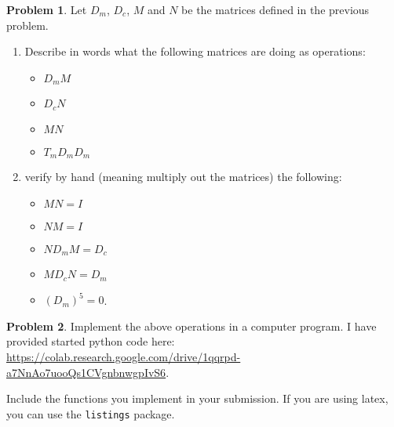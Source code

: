\documentclass[12pt]{article}
\theoremstyle{definition}
\newtheorem{problem}{Problem}
\begin{document}
\begin{problem}
    Let $D_m$, $D_c$, $M$ and $N$ be the matrices defined in the previous problem.
    \begin{enumerate}
        \item Describe in words what the following matrices are doing as operations:
        \begin{itemize}
            \item $D_m M$
            \item $D_c N$
            \item $M N$
            \item $T_m D_m D_m$
        \end{itemize}
        \item verify by hand (meaning multiply out the matrices) the following:
        \begin{itemize}
            \item $M N = I$
            \item $N M = I$
            \item $N D_m M = D_c$
            \item $M D_c N = D_m$
            \item $(D_m)^5 = 0$.
        \end{itemize}
    \end{enumerate}

\end{problem}

\begin{problem}
    Implement the above operations in a computer program. 
    I have provided started python code here: \url{https://colab.research.google.com/drive/1qqrpd-a7NnAo7uooQs1CVgnbnwgpIvS6}.

    Include the functions you implement in your submission.
    If you are using latex, you can use the \texttt{listings} package.
\end{problem}
\end{document}
